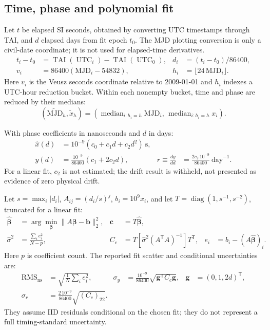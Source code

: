 \documentclass[11pt,a4paper]{article}
\begin{document}
\subsection{Time, phase and polynomial fit}
Let \(t\) be elapsed SI seconds, obtained by converting UTC timestamps through
TAI, and \(d\) elapsed days from fit epoch \(t_0\). The MJD plotting conversion
is only a civil-date coordinate; it is not used for elapsed-time derivatives.
\begin{align}
t_i-t_0&=\operatorname{TAI}(\operatorname{UTC}_i)-
          \operatorname{TAI}(\operatorname{UTC}_0),&
d_i&=(t_i-t_0)/86400, \tag{A1}\\
v_i&=86400(\mathrm{MJD}_i-54832),&
h_i&=\lfloor24\,\mathrm{MJD}_i\rfloor. \tag{A2}
\end{align}
Here \(v_i\) is the Veusz seconds coordinate relative to 2009-01-01 and \(h_i\)
indexes a UTC-hour reduction bucket. Within each nonempty bucket, time and
phase are reduced by their medians:
\begin{equation}
(\widetilde{\mathrm{MJD}}_h,\widetilde{x}_h)
=\left(\operatorname{median}_{i:h_i=h}\mathrm{MJD}_i,\,
       \operatorname{median}_{i:h_i=h}x_i\right). \tag{A3}
\end{equation}

With phase coefficients in nanoseconds and \(d\) in days:
\begin{align}
\widehat{x}(d)&=10^{-9}(c_0+c_1d+c_2d^2)\ \mathrm{s}, \tag{A4}\\
y(d)&=\frac{10^{-9}}{86400}(c_1+2c_2d),&
r\equiv\frac{dy}{dd}&=\frac{2c_2\,10^{-9}}{86400}\ \mathrm{day}^{-1}. \tag{A5}
\end{align}
For a linear fit, \(c_2\) is not estimated; the drift result is withheld, not
presented as evidence of zero physical drift.

Let \(s=\max_i|d_i|\), \(A_{ij}=(d_i/s)^j\), \(b_i=10^9x_i\), and let
\(T=\operatorname{diag}(1,s^{-1},s^{-2})\), truncated for a linear fit:
\begin{align}
\widehat{\boldsymbol\beta}&=\arg\min_{\boldsymbol\beta}
 \|A\boldsymbol\beta-\mathbf b\|_2^2,&
\mathbf c&=T\widehat{\boldsymbol\beta}, \tag{A6}\\
\widehat{\sigma}^2&=\frac{\sum_i e_i^2}{N-p},&
C_c&=T\left[\widehat{\sigma}^2(A^\mathsf{T}A)^{-1}\right]T^\mathsf{T},
 & e_i&=b_i-(A\widehat{\boldsymbol\beta})_i. \tag{A7}
\end{align}
Here \(p\) is coefficient count. The reported fit scatter and conditional
uncertainties are:
\begin{align}
\mathrm{RMS}_{\mathrm{ns}}&=\sqrt{\frac1N\sum_i e_i^2},&
\sigma_y&=\frac{10^{-9}}{86400}\sqrt{\mathbf g^\mathsf{T}C_c\mathbf g},
 &\mathbf g&=(0,1,2d)^\mathsf{T}, \tag{A8}\\
\sigma_r&=\frac{2\,10^{-9}}{86400}\sqrt{(C_c)_{22}}. \tag{A9}
\end{align}
They assume IID residuals conditional on the chosen fit; they do not represent
a full timing-standard uncertainty.
\clearpage
\end{document}
